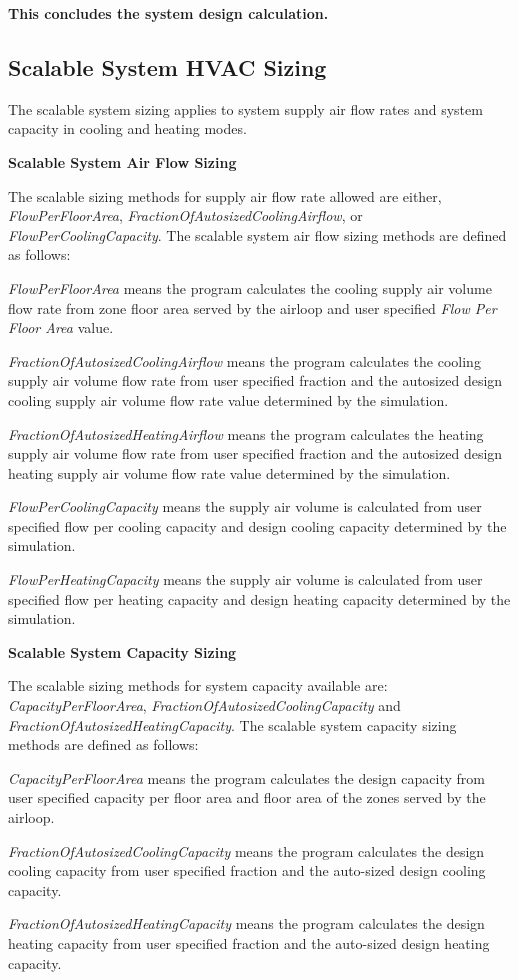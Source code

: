 \textbf{This concludes the system design calculation.}

\subsection{Scalable System HVAC Sizing}\label{scalable-system-HVAC-sizing}

The scalable system sizing applies to system supply air flow rates and system capacity in cooling and heating modes.

\textbf{Scalable System Air Flow Sizing}

The scalable sizing methods for supply air flow rate allowed are either, \emph{FlowPerFloorArea}, \emph{FractionOfAutosizedCoolingAirflow}, or \emph{FlowPerCoolingCapacity}. The scalable system air flow sizing methods are defined as follows:

\emph{FlowPerFloorArea} means the program calculates the cooling supply air volume flow rate from zone floor area served by the airloop and user specified \emph{Flow Per Floor Area} value.

\emph{FractionOfAutosizedCoolingAirflow} means the program calculates the cooling supply air volume flow rate from user specified fraction and the autosized design cooling supply air volume flow rate value determined by the simulation.

\emph{FractionOfAutosizedHeatingAirflow} means the program calculates the heating supply air volume flow rate from user specified fraction and the autosized design heating supply air volume flow rate value determined by the simulation.

\emph{FlowPerCoolingCapacity} means the supply air volume is calculated from user specified flow per cooling capacity and design cooling capacity determined by the simulation.

\emph{FlowPerHeatingCapacity} means the supply air volume is calculated from user specified flow per heating capacity and design heating capacity determined by the simulation.

\textbf{Scalable System Capacity Sizing}

The scalable sizing methods for system capacity available are: \emph{CapacityPerFloorArea}, \emph{FractionOfAutosizedCoolingCapacity} and \emph{FractionOfAutosizedHeatingCapacity}. The scalable system capacity sizing methods are defined as follows:

\emph{CapacityPerFloorArea} means the program calculates the design capacity from user specified capacity per floor area and floor area of the zones served by the airloop.

\emph{FractionOfAutosizedCoolingCapacity} means the program calculates the design cooling capacity from user specified fraction and the auto-sized design cooling capacity.

\emph{FractionOfAutosizedHeatingCapacity} means the program calculates the design heating capacity from user specified fraction and the auto-sized design heating capacity.
